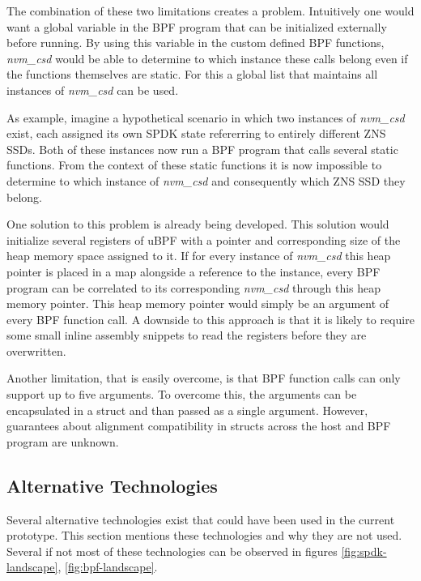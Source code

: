 \documentclass[conference]{IEEEtran}
\begin{document}
The combination of these two limitations creates a problem. Intuitively one
would want a global variable in the BPF program that can be initialized
externally before running. By using this variable in the custom defined BPF
functions, \textit{nvm\_csd} would be able to determine to which instance these
calls belong even if the functions themselves are static. For this a global
list that maintains all instances of \textit{nvm\_csd} can be used.

As example, imagine a hypothetical scenario in which two instances of
\textit{nvm\_csd} exist, each assigned its own SPDK state refererring to
entirely different ZNS SSDs. Both of these instances now run a BPF program that
calls several static functions. From the context of these static functions it is
now impossible to determine to which instance of \textit{nvm\_csd} and
consequently which ZNS SSD they belong.

One solution to this problem is already being
developed\cite{ubpf-seed-issue, ubpf-seed-patch}. This solution would initialize
several registers of uBPF with a pointer and corresponding size of the heap
memory space assigned to it. If for every instance of \textit{nvm\_csd} this
heap pointer is placed in a map alongside a reference to the instance, every BPF
program can be correlated to its corresponding \textit{nvm\_csd} through this
heap memory pointer. This heap memory pointer would simply be an argument
of every BPF function call. A downside to this approach is that it is likely to
require some small inline assembly snippets to read the registers before they
are overwritten.

Another limitation, that is easily overcome, is that BPF function calls can only
support up to five arguments. To overcome this, the arguments can be
encapsulated in a struct and than passed as a single argument. However,
guarantees about alignment compatibility in structs across the host and BPF
program are unknown.

\subsection{Alternative Technologies} \label{alternatives}

Several alternative technologies exist that could have been used in the current
prototype. This section mentions these technologies and why they are not used.
Several if not most of these technologies can be observed in figures
\ref{fig:spdk-landscape}, \ref{fig:bpf-landscape}.
\end{document}
